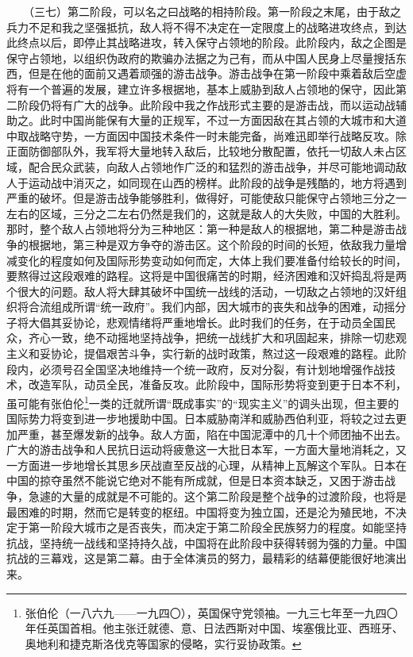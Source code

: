 \documentclass[cn,11pt,chinese]{elegantbook}
\begin{document}
　　（三七）第二阶段，可以名之曰战略的相持阶段。第一阶段之末尾，由于敌之兵力不足和我之坚强抵抗，敌人将不得不决定在一定限度上的战略进攻终点，到达此终点以后，即停止其战略进攻，转入保守占领地的阶段。此阶段内，敌之企图是保守占领地，以组织伪政府的欺骗办法据之为己有，而从中国人民身上尽量搜括东西，但是在他的面前又遇着顽强的游击战争。游击战争在第一阶段中乘着敌后空虚将有一个普遍的发展，建立许多根据地，基本上威胁到敌人占领地的保守，因此第二阶段仍将有广大的战争。此阶段中我之作战形式主要的是游击战，而以运动战辅助之。此时中国尚能保有大量的正规军，不过一方面因敌在其占领的大城市和大道中取战略守势，一方面因中国技术条件一时未能完备，尚难迅即举行战略反攻。除正面防御部队外，我军将大量地转入敌后，比较地分散配置，依托一切敌人未占区域，配合民众武装，向敌人占领地作广泛的和猛烈的游击战争，并尽可能地调动敌人于运动战中消灭之，如同现在山西的榜样。此阶段的战争是残酷的，地方将遇到严重的破坏。但是游击战争能够胜利，做得好，可能使敌只能保守占领地三分之一左右的区域，三分之二左右仍然是我们的，这就是敌人的大失败，中国的大胜利。那时，整个敌人占领地将分为三种地区：第一种是敌人的根据地，第二种是游击战争的根据地，第三种是双方争夺的游击区。这个阶段的时间的长短，依敌我力量增减变化的程度如何及国际形势变动如何而定，大体上我们要准备付给较长的时间，要熬得过这段艰难的路程。这将是中国很痛苦的时期，经济困难和汉奸捣乱将是两个很大的问题。敌人将大肆其破坏中国统一战线的活动，一切敌之占领地的汉奸组织将合流组成所谓“统一政府”。我们内部，因大城市的丧失和战争的困难，动摇分子将大倡其妥协论，悲观情绪将严重地增长。此时我们的任务，在于动员全国民众，齐心一致，绝不动摇地坚持战争，把统一战线扩大和巩固起来，排除一切悲观主义和妥协论，提倡艰苦斗争，实行新的战时政策，熬过这一段艰难的路程。此阶段内，必须号召全国坚决地维持一个统一政府，反对分裂，有计划地增强作战技术，改造军队，动员全民，准备反攻。此阶段中，国际形势将变到更于日本不利，虽可能有张伯伦\footnote[17]{ 张伯伦（一八六九——一九四〇），英国保守党领袖。一九三七年至一九四〇年任英国首相。他主张迁就德、意、日法西斯对中国、埃塞俄比亚、西班牙、奥地利和捷克斯洛伐克等国家的侵略，实行妥协政策。}一类的迁就所谓“既成事实”的“现实主义”的调头出现，但主要的国际势力将变到进一步地援助中国。日本威胁南洋和威胁西伯利亚，将较之过去更加严重，甚至爆发新的战争。敌人方面，陷在中国泥潭中的几十个师团抽不出去。广大的游击战争和人民抗日运动将疲惫这一大批日本军，一方面大量地消耗之，又一方面进一步地增长其思乡厌战直至反战的心理，从精神上瓦解这个军队。日本在中国的掠夺虽然不能说它绝对不能有所成就，但是日本资本缺乏，又困于游击战争，急遽的大量的成就是不可能的。这个第二阶段是整个战争的过渡阶段，也将是最困难的时期，然而它是转变的枢纽。中国将变为独立国，还是沦为殖民地，不决定于第一阶段大城市之是否丧失，而决定于第二阶段全民族努力的程度。如能坚持抗战，坚持统一战线和坚持持久战，中国将在此阶段中获得转弱为强的力量。中国抗战的三幕戏，这是第二幕。由于全体演员的努力，最精彩的结幕便能很好地演出来。\\
\end{document}
